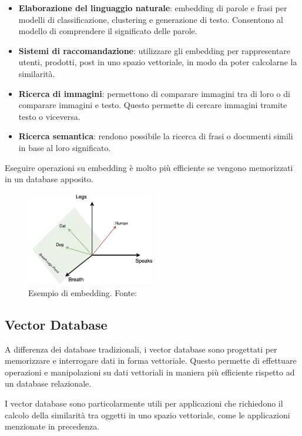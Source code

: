 \begin{itemize}
  \item \textbf{Elaborazione del linguaggio naturale}: embedding
        di parole e frasi per modelli di classificazione,
        clustering e generazione di testo.
        Consentono al modello di comprendere il significato delle
        parole.
  \item \textbf{Sistemi di raccomandazione}: utilizzare gli
        embedding per rappresentare utenti, prodotti, post in uno
        spazio vettoriale, in modo da poter calcolarne la similarità.
  \item \textbf{Ricerca di immagini}: permettono di comparare
        immagini tra di loro o di comparare immagini e testo.
        Questo permette di cercare immagini tramite testo o
        viceversa.
  \item \textbf{Ricerca semantica}: rendono possibile la ricerca di
        frasi o documenti simili in base al loro significato.
\end{itemize}

Eseguire operazioni su embedding è molto più efficiente se
vengono memorizzati in un database apposito.

\begin{figure}[H]
  \centering
  \includegraphics[width=0.5\textwidth]{res/embedding_space.png}
  \caption{Esempio di embedding. Fonte: \cite{olegborisovembeddingspace}}
  \label{fig:embedding-example}
\end{figure}

\subsection{Vector Database}
\label{sec:vector-database}
A differenza dei database tradizionali, i vector database
sono progettati per memorizzare e interrogare dati in forma
vettoriale.
Questo permette di effettuare operazioni e manipolazioni su
dati vettoriali in maniera più efficiente rispetto ad un
database relazionale.

I vector database sono particolarmente utili per
applicazioni che richiedono il calcolo della similarità tra
oggetti in uno spazio vettoriale, come le applicazioni
menzionate in precedenza.

